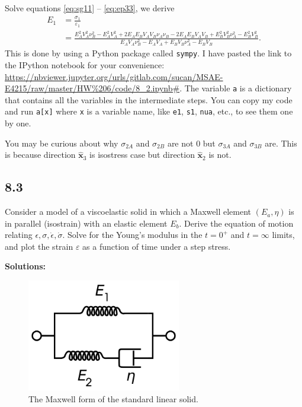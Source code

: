 \documentclass[12pt]{article}
\begin{document}
Solve equations \eqref{eq:sg11} -- \eqref{eq:ep33}, we derive
\begin{equation}
  \begin{split}
    E_1 &= \frac{ \sigma_1 }{ \varepsilon_1 } \\
    &= \frac{E_{A}^{2} V_{A}^{2} \nu_{B}^{2} - E_{A}^{2} V_{A}^{2} + 2 E_{A} E_{B} V_{A} V_{B} \nu_{A} \nu_{B} - 2 E_{A} E_{B} V_{A} V_{B} + E_{B}^{2} V_{B}^{2} \nu_{A}^{2} - E_{B}^{2} V_{B}^{2}}{E_{A} V_{A} \nu_{B}^{2} - E_{A} V_{A} + E_{B} V_{B} \nu_{A}^{2} - E_{B} V_{B}}.
  \end{split}
\end{equation}
This is done by using a Python package called \texttt{sympy}. I have pasted the link
to the IPython notebook for your convenience:
\url{https://nbviewer.jupyter.org/urls/gitlab.com/sucan/MSAE-E4215/raw/master/HW%206/code/8_2.ipynb#}.
The variable \texttt{a} is a dictionary that contains all the variables in the intermediate
steps.
You can copy my code and run \texttt{a[x]} where \texttt{x} is a variable name, like
\texttt{e1}, \texttt{s1}, \texttt{nua}, etc., to see them one by one.

You may be curious about why $\sigma_{2A}$ and $\sigma_{2B}$ are not $0$ but $\sigma_{3A}$ and $\sigma_{3B}$ are.
This is because direction $\hat{\bm{x}}_3$ is isostress case but direction $\hat{\bm{x}}_2$ is not.

\subsection{8.3}
Consider a model of a viscoelastic solid in which a Maxwell element $(E_a, \eta)$ is in
parallel (isostrain) with an elastic element $E_b$.
Derive the equation of motion relating $\epsilon,\sigma,\dot{\epsilon},\dot{\sigma}$.
Solve for the Young's modulus in the $t=0^+$ and $t=\infty$ limits, and plot
the strain $\varepsilon$ as a function of time under a step stress.

\textbf{Solutions:}
\begin{figure}[h]
  \centering
  \includegraphics[width=0.6\textwidth]{images/Maxwell}
  \caption{The Maxwell form of the standard linear solid.}
  \label{fig:Maxwell}
\end{figure}
\end{document}
